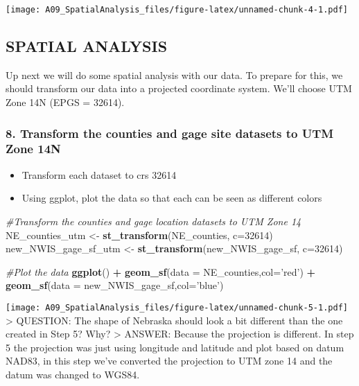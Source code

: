 \documentclass[]{article}
\newenvironment{Shaded}{\begin{snugshade}}{\end{snugshade}}
\newcommand{\KeywordTok}[1]{\textcolor[rgb]{0.13,0.29,0.53}{\textbf{#1}}}
\newcommand{\DataTypeTok}[1]{\textcolor[rgb]{0.13,0.29,0.53}{#1}}
\newcommand{\DecValTok}[1]{\textcolor[rgb]{0.00,0.00,0.81}{#1}}
\newcommand{\StringTok}[1]{\textcolor[rgb]{0.31,0.60,0.02}{#1}}
\newcommand{\CommentTok}[1]{\textcolor[rgb]{0.56,0.35,0.01}{\textit{#1}}}
\newcommand{\OperatorTok}[1]{\textcolor[rgb]{0.81,0.36,0.00}{\textbf{#1}}}
\newcommand{\NormalTok}[1]{#1}
\providecommand{\tightlist}{%
  \setlength{\itemsep}{0pt}\setlength{\parskip}{0pt}}
\begin{document}
\texttt{[image: A09\_SpatialAnalysis\_files/figure-latex/unnamed-chunk-4-1.pdf]}

\subsection{SPATIAL ANALYSIS}\label{spatial-analysis}

Up next we will do some spatial analysis with our data. To prepare for
this, we should transform our data into a projected coordinate system.
We'll choose UTM Zone 14N (EPGS = 32614).

\subsubsection{8. Transform the counties and gage site datasets to UTM
Zone
14N}\label{transform-the-counties-and-gage-site-datasets-to-utm-zone-14n}

\begin{itemize}
\tightlist
\item
  Transform each dataset to crs 32614
\item
  Using ggplot, plot the data so that each can be seen as different
  colors
\end{itemize}

\begin{Shaded}
\begin{Highlighting}[]
\CommentTok{#Transform the counties and gage location datasets to UTM Zone 14}
\NormalTok{NE_counties_utm <-}\StringTok{ }\KeywordTok{st_transform}\NormalTok{(NE_counties, }\DataTypeTok{c=}\DecValTok{32614}\NormalTok{)}
\NormalTok{new_NWIS_gage_sf_utm <-}\StringTok{ }\KeywordTok{st_transform}\NormalTok{(new_NWIS_gage_sf, }\DataTypeTok{c=}\DecValTok{32614}\NormalTok{)}

\CommentTok{#Plot the data}
\KeywordTok{ggplot}\NormalTok{() }\OperatorTok{+}
\StringTok{  }\KeywordTok{geom_sf}\NormalTok{(}\DataTypeTok{data =}\NormalTok{ NE_counties,}\DataTypeTok{col=}\StringTok{'red'}\NormalTok{) }\OperatorTok{+}
\StringTok{  }\KeywordTok{geom_sf}\NormalTok{(}\DataTypeTok{data =}\NormalTok{ new_NWIS_gage_sf,}\DataTypeTok{col=}\StringTok{'blue'}\NormalTok{)}
\end{Highlighting}
\end{Shaded}

\texttt{[image: A09\_SpatialAnalysis\_files/figure-latex/unnamed-chunk-5-1.pdf]}
\textgreater{} QUESTION: The shape of Nebraska should look a bit
different than the one created in Step 5? Why? \textgreater{} ANSWER:
Because the projection is different. In step 5 the projection was just
using longitude and latitude and plot based on datum NAD83, in this step
we've converted the projection to UTM zone 14 and the datum was changed
to WGS84.
\end{document}
